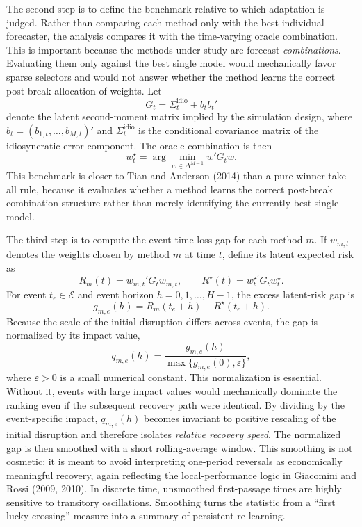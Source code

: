 \documentclass[11pt,a4paper]{article}
\newcommand{\simplex}{\Delta^{M-1}}
\begin{document}
The second step is to define the benchmark relative to which adaptation is judged. Rather than comparing each method only with the best individual forecaster, the analysis compares it with the time-varying oracle combination. This is important because the methods under study are forecast \emph{combinations}. Evaluating them only against the best single model would mechanically favor sparse selectors and would not answer whether the method learns the correct post-break allocation of weights. Let
\begin{equation}
G_t = \Sigma_t^{\mathrm{idio}} + b_t b_t'
\end{equation}
denote the latent second-moment matrix implied by the simulation design, where $b_t=(b_{1,t},\dots,b_{M,t})'$ and $\Sigma_t^{\mathrm{idio}}$ is the conditional covariance matrix of the idiosyncratic error component. The oracle combination is then
\begin{equation}
w_t^\star = \arg\min_{w \in \simplex} w'G_t w.
\end{equation}
This benchmark is closer to Tian and Anderson (2014) than a pure winner-take-all rule, because it evaluates whether a method learns the correct post-break combination structure rather than merely identifying the currently best single model.

The third step is to compute the event-time loss gap for each method $m$. If $w_{m,t}$ denotes the weights chosen by method $m$ at time $t$, define its latent expected risk as
\begin{equation}
R_m(t) = w_{m,t}'G_t w_{m,t},
\qquad
R^\star(t) = w_t^{\star\prime} G_t w_t^\star.
\end{equation}
For event $t_e \in \mathcal{E}$ and event horizon $h=0,1,\dots,H-1$, the excess latent-risk gap is
\begin{equation}
g_{m,e}(h) = R_m(t_e+h) - R^\star(t_e+h).
\end{equation}
Because the scale of the initial disruption differs across events, the gap is normalized by its impact value,
\begin{equation}
q_{m,e}(h) = \frac{g_{m,e}(h)}{\max\{g_{m,e}(0),\varepsilon\}},
\end{equation}
where $\varepsilon>0$ is a small numerical constant. This normalization is essential. Without it, events with large impact values would mechanically dominate the ranking even if the subsequent recovery path were identical. By dividing by the event-specific impact, $q_{m,e}(h)$ becomes invariant to positive rescaling of the initial disruption and therefore isolates \emph{relative recovery speed}. The normalized gap is then smoothed with a short rolling-average window. This smoothing is not cosmetic; it is meant to avoid interpreting one-period reversals as economically meaningful recovery, again reflecting the local-performance logic in Giacomini and Rossi (2009, 2010). In discrete time, unsmoothed first-passage times are highly sensitive to transitory oscillations. Smoothing turns the statistic from a ``first lucky crossing'' measure into a summary of persistent re-learning.
\end{document}

